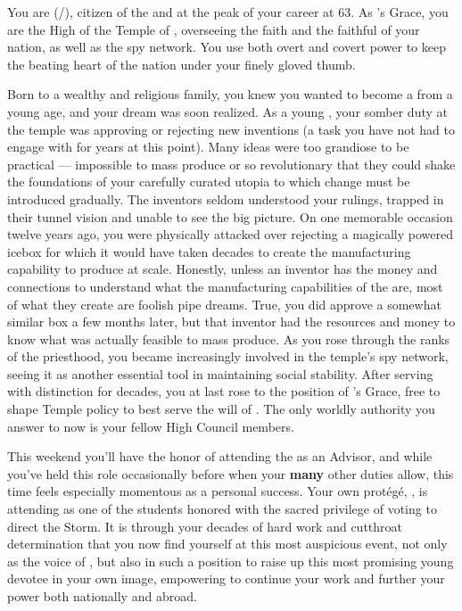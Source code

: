 \documentclass[char]{GL2020}
\begin{document}
\name{\cAntiChup{}}

You are \cAntiChup{\full} (\cAntiChup{\they}/\cAntiChup{\them}), citizen of the \pTech{} and at the peak of your career at 63. As \cTechGod{}'s Grace, you are the High \cAntiChup{\Cleric} of the Temple of \cTechGod{}, overseeing the faith and the faithful of your nation, as well as the \pTech{} spy network. You use both overt and covert power to keep the beating heart of the nation under your finely gloved thumb.

Born to a wealthy and religious family, you knew you wanted to become a \cAntiChup{\cleric} from a young age, and your dream was soon realized. As a young \cAntiChup{\cleric}, your somber duty at the temple was approving or rejecting new inventions (a task you have not had to engage with for years at this point). Many ideas were too grandiose to be practical — impossible to mass produce or so revolutionary that they could shake the foundations of your carefully curated utopia to which change must be introduced gradually. The inventors seldom understood your rulings, trapped in their tunnel vision and unable to see the big picture. On one memorable occasion twelve years ago, you were physically attacked over rejecting a magically powered icebox for which it would have taken decades to create the manufacturing capability to produce at scale. Honestly, unless an inventor has the money and connections to understand what the manufacturing capabilities of the \pTech{} are, most of what they create are foolish pipe dreams. True, you did approve a somewhat similar box a few months later, but that inventor had the resources and money to know what was actually feasible to mass produce. As you rose through the ranks of the priesthood, you became increasingly involved in the temple's spy network, seeing it as another essential tool in maintaining social stability. After serving with distinction for decades, you at last rose to the position of \cTechGod{}'s Grace, free to shape Temple policy to best serve the will of \cTechGod{}. The only worldly authority you answer to now is your fellow High Council members.

This weekend you'll have the honor of attending the \pSchool{} as an Advisor, and while you've held this role occasionally before when your \textbf{many} other duties allow, this time feels especially momentous as a personal success. Your own protégé, \cScholarship{\full}, is attending as one of the students honored with the sacred privilege of voting to direct the Storm. It is through your decades of hard work and cutthroat determination that you now find yourself at this most auspicious event, not only as the voice of \cTechGod{} \cTechGod{\themself}, but also in such a position to raise up this most promising young devotee in your own image, empowering \cScholarship{\them} to continue your work and further your power both nationally and abroad.  
\end{document}
